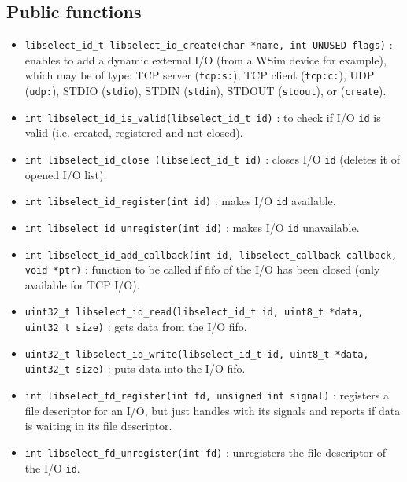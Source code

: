 \documentclass[a4paper,10pt]{report}
\begin{document}
\subsection{Public functions}
\begin{itemize}
  \item \verb$libselect_id_t libselect_id_create(char *name, int UNUSED flags)$ : enables to add a dynamic external I/O (from a WSim device for example), which may be of type: TCP server (\verb$tcp:s:$), TCP client (\verb$tcp:c:$), UDP (\verb$udp:$), STDIO (\verb$stdio$), STDIN (\verb$stdin$), STDOUT (\verb$stdout$), or  (\verb$create$).

  \item \verb$int libselect_id_is_valid(libselect_id_t id)$ : to check if I/O \verb$id$ is valid (i.e. created, registered and not closed).

  \item \verb$int libselect_id_close (libselect_id_t id)$ : closes I/O \verb$id$ (deletes it of opened I/O list).

  \item \verb$int libselect_id_register(int id)$ : makes I/O \verb$id$ available.

  \item \verb$int libselect_id_unregister(int id)$ : makes I/O \verb$id$ unavailable.

  \item \verb$int libselect_id_add_callback(int id, libselect_callback callback, void *ptr)$ : function to be called if fifo of the I/O has been closed (only available for TCP I/O).

  \item \verb$uint32_t libselect_id_read(libselect_id_t id, uint8_t *data, uint32_t size)$ : gets data from the I/O fifo.

  \item \verb$uint32_t libselect_id_write(libselect_id_t id, uint8_t *data, uint32_t size)$ : puts data into the I/O fifo.

  \item \verb$int libselect_fd_register(int fd, unsigned int signal)$ : registers a file descriptor for an I/O, but just handles with its signals and reports if data is waiting in its file descriptor.

  \item \verb$int libselect_fd_unregister(int fd)$ : unregisters the file descriptor of the I/O \verb$id$.
\end{itemize}
\end{document}
